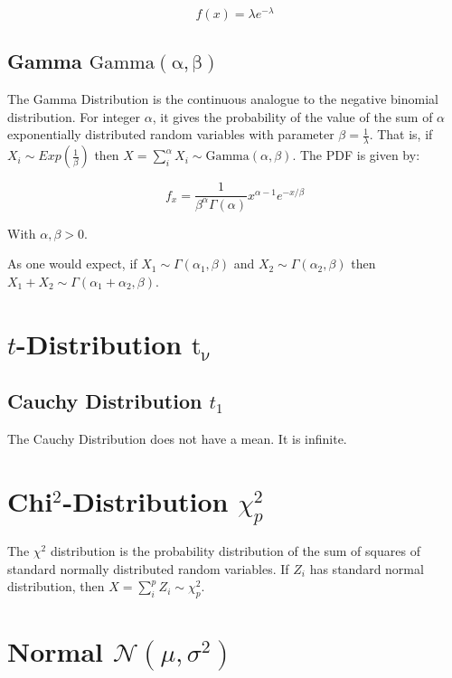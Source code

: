 \begin{equation}
f(x) = \lambda e^{-\lambda}
\end{equation}


\subsection{Gamma $\mathrm{Gamma(\alpha,\beta)}$}
The Gamma Distribution is the continuous analogue to the negative binomial distribution. For integer $\alpha$, it gives the probability of the value of the sum of $\alpha$ exponentially distributed random variables with parameter $\beta=\frac{1}{\lambda}$. That is, if $X_i \sim Exp(\frac{1}{\beta})$ then $X = \sum_i^\alpha X_i \sim \mathrm{Gamma}(\alpha,\beta)$. The PDF is given by:

\begin{equation}
f_x = \frac{1}{\beta^\alpha \Gamma(\alpha)}x^{\alpha-1}e^{-x/\beta}
\end{equation}

With $\alpha,\beta > 0$.

As one would expect, if $X_1 \sim \Gamma(\alpha_1,\beta)$ and $X_2 \sim \Gamma(\alpha_2,\beta)$ then $X_1 + X_2 \sim \Gamma(\alpha_1+\alpha_2,\beta)$. 



\section{$t$-Distribution $\mathrm{t_\nu\ }$}

\subsection{Cauchy Distribution $t_1$}
The Cauchy Distribution does not have a mean. It is infinite.


\section{Chi$^2$-Distribution $\chi^2_p$}
The $\chi^2$ distribution is the probability distribution of the sum of squares of standard normally distributed random variables. If $Z_i$ has standard normal distribution, then $X = \sum_i^p Z_i \sim \chi^2_p$.


\section{Normal $\mathscr{N}(\mu,\sigma^2)$}


